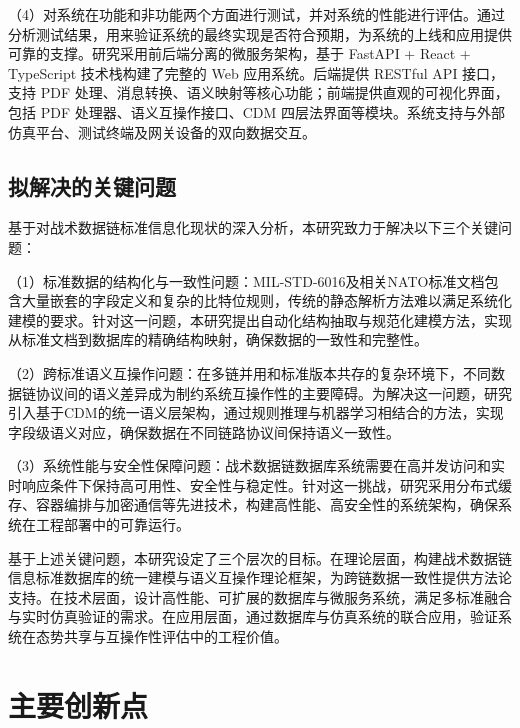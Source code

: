 （4）对系统在功能和非功能两个方面进行测试，并对系统的性能进行评估。通过分析测试结果，用来验证系统的最终实现是否符合预期，为系统的上线和应用提供可靠的支撑。研究采用前后端分离的微服务架构，基于 FastAPI + React + TypeScript 技术栈构建了完整的 Web 应用系统\cite{Waseem2021Design,MonitoringTools2024}。后端提供 RESTful API 接口，支持 PDF 处理、消息转换、语义映射等核心功能；前端提供直观的可视化界面，包括 PDF 处理器、语义互操作接口、CDM 四层法界面等模块。系统支持与外部仿真平台、测试终端及网关设备的双向数据交互\cite{SAIC_JRE_Overview_2021,Collins_TTR_2021,L3Harris_STT_KOR24A_2020}。


\subsection{拟解决的关键问题}

基于对战术数据链标准信息化现状的深入分析，本研究致力于解决以下三个关键问题：

（1）标准数据的结构化与一致性问题：MIL-STD-6016及相关NATO标准文档包含大量嵌套的字段定义和复杂的比特位规则，传统的静态解析方法难以满足系统化建模的要求\cite{MIL_STD_6016_Active_2024,SISO_STD_002_2006}。针对这一问题，本研究提出自动化结构抽取与规范化建模方法，实现从标准文档到数据库的精确结构映射，确保数据的一致性和完整性。

（2）跨标准语义互操作问题：在多链并用和标准版本共存的复杂环境下，不同数据链协议间的语义差异成为制约系统互操作性的主要障碍\cite{Hamdan2023Reference,MITRE_Link16_Interoperability_2024}。为解决这一问题，研究引入基于CDM的统一语义层架构，通过规则推理与机器学习相结合的方法，实现字段级语义对应，确保数据在不同链路协议间保持语义一致性。

（3）系统性能与安全性保障问题：战术数据链数据库系统需要在高并发访问和实时响应条件下保持高可用性、安全性与稳定性\cite{Waseem2021Design,MonitoringTools2024}。针对这一挑战，研究采用分布式缓存、容器编排与加密通信等先进技术，构建高性能、高安全性的系统架构，确保系统在工程部署中的可靠运行。

基于上述关键问题，本研究设定了三个层次的目标。在理论层面，构建战术数据链信息标准数据库的统一建模与语义互操作理论框架，为跨链数据一致性提供方法论支持。在技术层面，设计高性能、可扩展的数据库与微服务系统，满足多标准融合与实时仿真验证的需求。在应用层面，通过数据库与仿真系统的联合应用，验证系统在态势共享与互操作性评估中的工程价值\cite{SAIC_JRE_Overview_2021,CurtissWright_TCG_HUNTR_2020,DOTE_2022_MIDS_LVT}。

\section{主要创新点}

